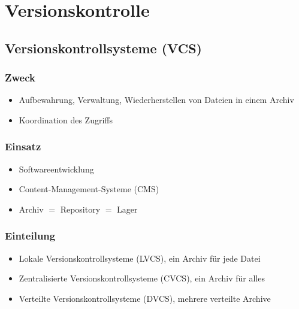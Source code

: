 \section{Versionskontrolle}
\subsection{Versionskontrollsysteme (VCS)}

\begin{multicols}{2}
	\subsubsection{Zweck}
	\begin{itemize}
		\item Aufbewahrung, Verwaltung, Wiederherstellen von Dateien in einem Archiv
		\item Koordination des Zugriffs
	\end{itemize}
	
	\subsubsection{Einsatz}
	\begin{itemize}
		\item Softwareentwicklung
		\item Content-Management-Systeme (CMS)
		\item Archiv $=$ Repository $=$ Lager
	\end{itemize}
\end{multicols}

\subsubsection{Einteilung}
	\begin{itemize}
		\item Lokale Versionskontrollsysteme (LVCS), ein Archiv für jede Datei
		\item Zentralisierte Versionskontrollsysteme (CVCS), ein Archiv für alles
		\item Verteilte Versionskontrollsysteme (DVCS), mehrere verteilte Archive
\end{itemize}

